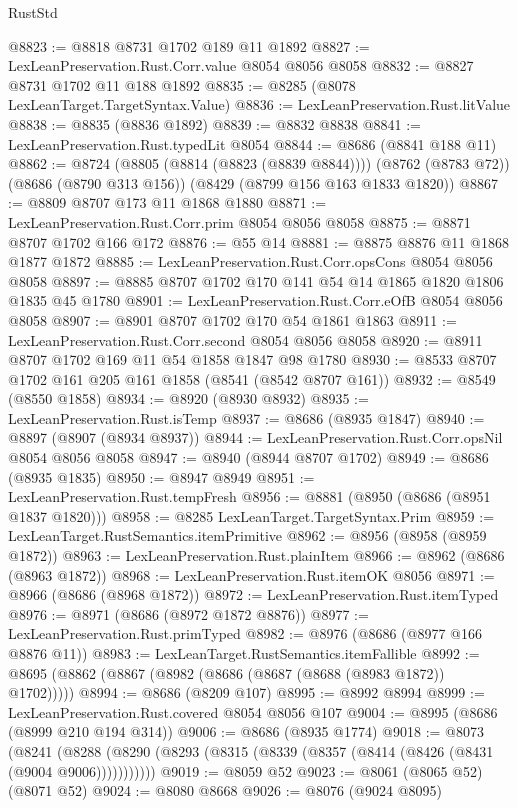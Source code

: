 \begin{lexlean}{RustStd}
\begin{coremodule}
@8823 := @8818 @8731 @1702 @189 @11 @1892
@8827 := LexLeanPreservation.Rust.Corr.value @8054 @8056 @8058
@8832 := @8827 @8731 @1702 @11 @188 @1892
@8835 := @8285 (@8078 LexLeanTarget.TargetSyntax.Value)
@8836 := LexLeanPreservation.Rust.litValue
@8838 := @8835 (@8836 @1892)
@8839 := @8832 @8838
@8841 := LexLeanPreservation.Rust.typedLit @8054
@8844 := @8686 (@8841 @188 @11)
@8862 := @8724
    (@8805 (@8814 (@8823 (@8839 @8844))))
    (@8762 (@8783 @72))
    (@8686 (@8790 @313 @156))
    (@8429 (@8799 @156 @163 @1833 @1820))
@8867 := @8809 @8707 @173 @11 @1868 @1880
@8871 := LexLeanPreservation.Rust.Corr.prim @8054 @8056 @8058
@8875 := @8871 @8707 @1702 @166 @172
@8876 := @55 @14
@8881 := @8875 @8876 @11 @1868 @1877 @1872
@8885 := LexLeanPreservation.Rust.Corr.opsCons @8054 @8056 @8058
@8897 := @8885 @8707 @1702 @170 @141 @54 @14 @1865 @1820 @1806 @1835 @45 @1780
@8901 := LexLeanPreservation.Rust.Corr.eOfB @8054 @8056 @8058
@8907 := @8901 @8707 @1702 @170 @54 @1861 @1863
@8911 := LexLeanPreservation.Rust.Corr.second @8054 @8056 @8058
@8920 := @8911 @8707 @1702 @169 @11 @54 @1858 @1847 @98 @1780
@8930 := @8533 @8707 @1702 @161 @205 @161 @1858 (@8541 (@8542 @8707 @161))
@8932 := @8549 (@8550 @1858)
@8934 := @8920 (@8930 @8932)
@8935 := LexLeanPreservation.Rust.isTemp
@8937 := @8686 (@8935 @1847)
@8940 := @8897 (@8907 (@8934 @8937))
@8944 := LexLeanPreservation.Rust.Corr.opsNil @8054 @8056 @8058
@8947 := @8940 (@8944 @8707 @1702)
@8949 := @8686 (@8935 @1835)
@8950 := @8947 @8949
@8951 := LexLeanPreservation.Rust.tempFresh
@8956 := @8881 (@8950 (@8686 (@8951 @1837 @1820)))
@8958 := @8285 LexLeanTarget.TargetSyntax.Prim
@8959 := LexLeanTarget.RustSemantics.itemPrimitive
@8962 := @8956 (@8958 (@8959 @1872))
@8963 := LexLeanPreservation.Rust.plainItem
@8966 := @8962 (@8686 (@8963 @1872))
@8968 := LexLeanPreservation.Rust.itemOK @8056
@8971 := @8966 (@8686 (@8968 @1872))
@8972 := LexLeanPreservation.Rust.itemTyped
@8976 := @8971 (@8686 (@8972 @1872 @8876))
@8977 := LexLeanPreservation.Rust.primTyped
@8982 := @8976 (@8686 (@8977 @166 @8876 @11))
@8983 := LexLeanTarget.RustSemantics.itemFallible
@8992 := @8695 (@8862 (@8867 (@8982 (@8686 (@8687 (@8688 (@8983 @1872)) @1702)))))
@8994 := @8686 (@8209 @107)
@8995 := @8992 @8994
@8999 := LexLeanPreservation.Rust.covered @8054 @8056 @107
@9004 := @8995 (@8686 (@8999 @210 @194 @314))
@9006 := @8686 (@8935 @1774)
@9018 := @8073
    (@8241 (@8288 (@8290 (@8293 (@8315 (@8339 (@8357 (@8414 (@8426 (@8431 (@9004 @9006)))))))))))
@9019 := @8059 @52
@9023 := @8061 (@8065 @52) (@8071 @52)
@9024 := @8080 @8668
@9026 := @8076 (@9024 @8095)

\end{coremodule}
\end{lexlean}
